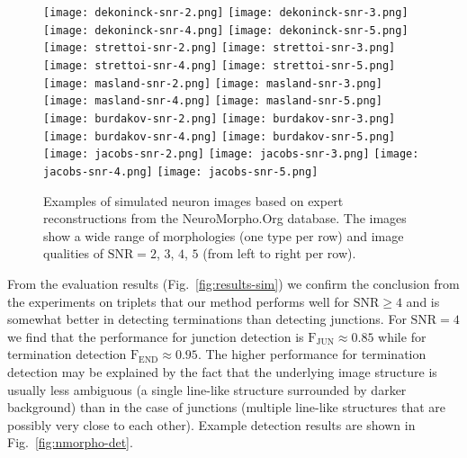 \documentclass[twocolumn,natbib]{svjour3}
\begin{document}
\begin{figure}[!t]
\centering
\texttt{[image: dekoninck-snr-2.png]}
\texttt{[image: dekoninck-snr-3.png]}
\texttt{[image: dekoninck-snr-4.png]}
\texttt{[image: dekoninck-snr-5.png]}\\
\texttt{[image: strettoi-snr-2.png]}
\texttt{[image: strettoi-snr-3.png]}
\texttt{[image: strettoi-snr-4.png]}
\texttt{[image: strettoi-snr-5.png]}\\
\texttt{[image: masland-snr-2.png]}
\texttt{[image: masland-snr-3.png]}
\texttt{[image: masland-snr-4.png]}
\texttt{[image: masland-snr-5.png]}\\
\texttt{[image: burdakov-snr-2.png]}
\texttt{[image: burdakov-snr-3.png]}
\texttt{[image: burdakov-snr-4.png]}
\texttt{[image: burdakov-snr-5.png]}\\
\texttt{[image: jacobs-snr-2.png]}
\texttt{[image: jacobs-snr-3.png]}
\texttt{[image: jacobs-snr-4.png]}
\texttt{[image: jacobs-snr-5.png]}
\caption{Examples of simulated neuron images based on expert reconstructions from the NeuroMorpho.Org database. The images show a wide range of morphologies (one type per row) and image qualities of $\textrm{SNR}=2$, $3$, $4$, $5$ (from left to right per row).}
\label{fig:nmorpho}
\end{figure}

From the evaluation results (Fig.~\ref{fig:results-sim}) we confirm the conclusion from the experiments on triplets that our method performs well for $\textrm{SNR}\geq4$ and is somewhat better in detecting terminations than detecting junctions. For $\textrm{SNR}=4$ we find that the performance for junction detection is $\textrm{F}_{\textrm{JUN}}\approx0.85$ while for termination detection $\textrm{F}_{\textrm{END}}\approx0.95$. The higher performance for termination detection may be explained by the fact that the underlying image structure is usually less ambiguous (a single line-like structure surrounded by darker background) than in the case of junctions (multiple line-like structures that are possibly very close to each other). Example detection results are shown in Fig.~\ref{fig:nmorpho-det}.
\end{document}
